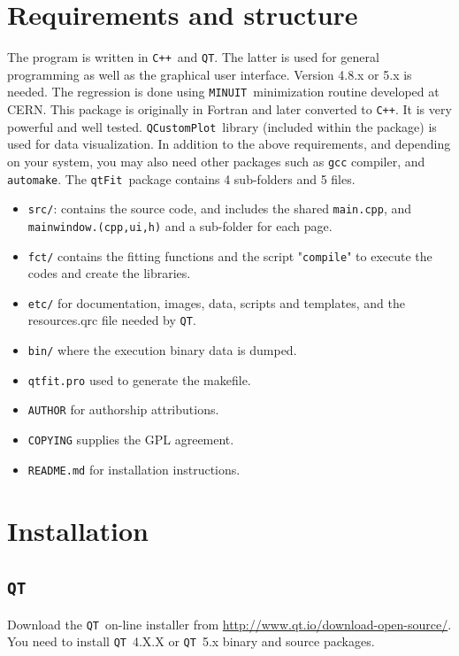 \documentclass[10pt,letterpaper,oneside]{article}
\newcommand{\cpp}{\texttt{C++}}
\newcommand{\qt}{\texttt{QT}}
\newcommand{\minuit}{\texttt{MINUIT}}
\newcommand{\name}{\texttt{qtFit}}
\newcommand{\qcp}{\texttt{QCustomPlot}}
\begin{document}

 \section{Requirements and structure}
The program is written in \cpp\ and \qt. The latter is used for general programming as well as the graphical user interface.  Version 4.8.x or 5.x is needed. The regression is done using \minuit\ minimization routine developed
at CERN. This package is originally in Fortran and later converted to \cpp. 
It is very powerful and well tested. \qcp\ library (included within the package) is used for data visualization. In addition to the above requirements, and depending on your system, you may also need other packages such as \texttt{gcc} compiler, and
\texttt{automake}. The \name\ package contains 4 sub-folders and 5 files.
\begin{itemize}
 \item \verb+src/+: contains the source code, and includes the shared \verb+main.cpp+, and 
 \verb+mainwindow.(cpp,ui,h)+ and a sub-folder for each page.
 \item \verb+fct/+ contains the fitting functions and the script "\verb+compile+"
 to execute the codes and create the libraries.
 \item \verb+etc/+ for documentation, images, data, scripts
and templates, and the resources.qrc file needed by \qt.
\item \verb+bin/+ where the execution binary data is dumped.
 \item \verb+qtfit.pro+ used to generate the makefile.
 \item  \verb+AUTHOR+ for authorship attributions.
 \item \verb+COPYING+ supplies the GPL agreement.
 \item \verb+README.md+ for installation instructions.
 \end{itemize}


\section{Installation}
\subsection{\qt}
Download the \qt\ on-line installer from \url{http://www.qt.io/download-open-source/}. 
You need to install \qt\ 4.X.X or \qt\ 5.x binary and source packages.
\end{document}
